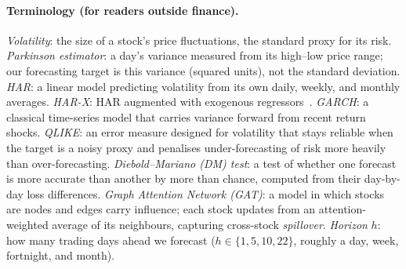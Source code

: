 \documentclass[runningheads]{llncs}
\begin{document}
\paragraph{Terminology (for readers outside finance).}
\emph{Volatility}: the size of a stock's price fluctuations, the standard proxy for its risk.
\emph{Parkinson estimator}: a day's variance measured from its high--low price range; our
forecasting target is this variance (squared units), not the standard deviation.
\emph{HAR}: a linear model predicting volatility from its own daily, weekly, and monthly averages.
\emph{HAR-X}: HAR augmented with exogenous regressors~\cite{corsi2009,clements2024}.
\emph{GARCH}: a classical time-series model that carries variance forward from recent return shocks.
\emph{QLIKE}: an error measure designed for volatility that stays reliable when the target is a noisy
proxy and penalises under-forecasting of risk more heavily than over-forecasting.
\emph{Diebold--Mariano (DM) test}: a test of whether one forecast is more accurate than another by
more than chance, computed from their day-by-day loss differences.
\emph{Graph Attention Network (GAT)}: a model in which stocks are nodes and edges carry influence;
each stock updates from an attention-weighted average of its neighbours, capturing cross-stock
\emph{spillover}.
\emph{Horizon} $h$: how many trading days ahead we forecast ($h\in\{1,5,10,22\}$, roughly a day,
week, fortnight, and month).
\end{document}
